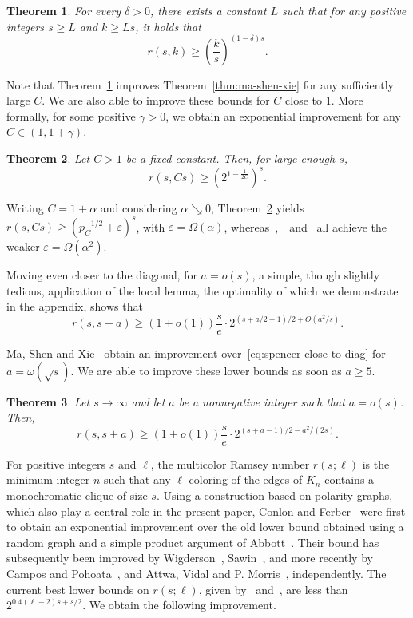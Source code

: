 \documentclass{article}
\theoremstyle{plain}
\newtheorem{theorem}{Theorem}[section]
\theoremstyle{definition}
\def\eps {\varepsilon}
\begin{document}
\begin{theorem} \label{thm:off-diagonal-general}
    For every $\delta > 0$, there exists a constant $L$ such that for any positive integers $s \ge L$ and $k \ge Ls$, it holds that 
    \[ r(s, k) \ge \left( \frac{k}{s}\right)^{(1 - \delta) s}. \]
\end{theorem}

Note that Theorem~\ref{thm:off-diagonal-general} improves Theorem~\ref{thm:ma-shen-xie} for any sufficiently large $C$. We are also able to improve these bounds for $C$ close to $1$. More formally, for some positive $\gamma > 0$, we obtain an exponential improvement for any $C \in (1, 1+\gamma)$.
\begin{theorem} \label{thm:k-Ck}
    Let $C > 1$ be a fixed constant. Then, for large enough $s$,
    \[ r(s, Cs) \ge (2^{1 - \frac{1}{2C}})^s. \]
\end{theorem}
Writing $C = 1 + \alpha$ and considering $\alpha \searrow 0$, Theorem~\ref{thm:k-Ck} yields $r(s, Cs) \ge (p_C^{-1/2} + \eps)^s$, with $\eps = \Omega(\alpha)$, whereas~\cite{ma-shen-xie},~\cite{hunter-milojevic-sudakov}~and~\cite{lin-niu} all achieve the weaker $\eps = \Omega(\alpha^2)$.

Moving even closer to the diagonal, for $a = o(s)$, a simple, though slightly tedious, application of the local lemma, the optimality of which we demonstrate in the appendix, shows that 
\begin{equation} \label{eq:spencer-close-to-diag}
    r(s, s+a) \ge (1 + o(1)) \frac{s}{e} \cdot 2^{(s+a/2+1)/2 + O(a^2/s)}.
\end{equation}

Ma, Shen and Xie~\cite{ma-shen-xie} obtain an improvement over~\eqref{eq:spencer-close-to-diag} for $a = \omega(\sqrt{s})$. We are able to improve these lower bounds as soon as $a \ge 5$.
\begin{theorem} \label{thm:close}
    Let $s \rightarrow \infty$ and let $a$ be a nonnegative integer such that $a = o(s)$. Then, 
    \[ r(s, s+a) \ge (1 + o(1)) \frac{s}{e}\cdot 2^{(s+a-1)/2 - a^2 / (2s)}. \]
\end{theorem}

For positive integers $s$ and $\ell$, the multicolor Ramsey number $r(s; \ell)$ is the minimum integer $n$ such that any \mbox{$\ell$-coloring} of the edges of $K_n$ contains a monochromatic clique of size $s$. Using a construction based on polarity graphs, which also play a central role in the present paper, Conlon and Ferber~\cite{conlon-ferber} were first to obtain an exponential improvement over the old lower bound obtained using a random graph and a simple product argument of Abbott~\cite{abbott}. Their bound has subsequently been improved by Wigderson~\cite{wigderson}, Sawin~\cite{sawin}, and more recently by Campos and Pohoata~\cite{campos-pohoata}, and Attwa, Vidal and P. Morris~\cite{attwa-vidal-morris}, independently. The current best lower bounds on $r(s; \ell)$, given by~\cite{campos-pohoata} and~\cite{attwa-vidal-morris}, are less than $2^{0.4(\ell-2) s + s/2}$. We obtain the following improvement.
\end{document}
